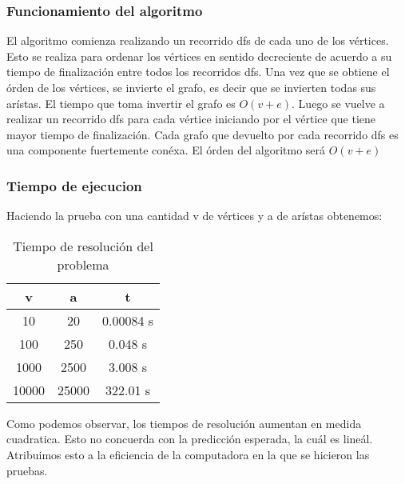 \documentclass{article}
\begin{document}
            \subsubsection{Funcionamiento del algoritmo}
                El algoritmo comienza realizando un recorrido dfs de cada uno de los
                vértices. Esto se realiza para ordenar los vértices en sentido
                decreciente de acuerdo a su tiempo de finalización entre todos los
                recorridos dfs. Una vez que se obtiene el órden de los vértices,
                se invierte el grafo, es decir que se invierten todas sus arístas.
                El tiempo que toma invertir el grafo es $O(v+e)$. Luego se vuelve a
                realizar un recorrido dfs para cada vértice iniciando por el vértice
                que tiene mayor tiempo de finalización. Cada grafo que devuelto por cada
                recorrido dfs es una componente fuertemente conéxa.
                El órden del algoritmo será $O(v+e)$

            \subsubsection{Tiempo de ejecucion}
              Haciendo la prueba con una cantidad v de vértices y a de arístas obtenemos:
                \begin{table}[h!]
                    \centering
                    \caption{Tiempo de resolución del problema}
                    \begin{tabular}{c|c|c}
                        v & a & t \\
                        \hline
                        10 & 20 & 0.00084 s \\
                        \hline
                        100 & 250 & 0.048 s \\
                        \hline
                        1000 & 2500 & 3.008 s \\
                        \hline
                        10000 & 25000 & 322.01 s
                    \end{tabular}
                \end{table}

                Como podemos observar, los tiempos de resolución aumentan en medida
                cuadratica. Esto no concuerda con la predicción esperada, la cuál es
                lineál. Atribuimos esto a la eficiencia de la computadora en la que
                se hicieron las pruebas.
\end{document}
